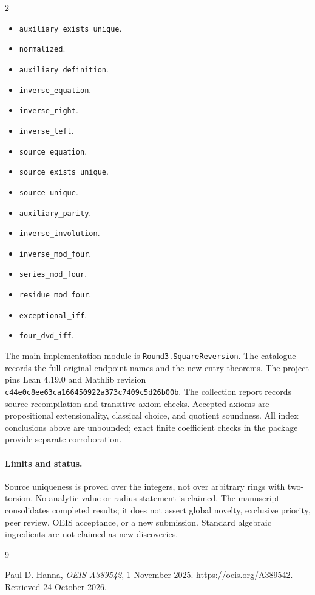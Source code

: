 \documentclass[11pt,a4paper]{article}
\theoremstyle{remark}
\begin{document}
\begin{multicols}{2}\raggedright\begin{itemize}\setlength{\itemsep}{2pt}\setlength{\parsep}{0pt}
\item \nolinkurl{auxiliary_exists_unique}.
\item \nolinkurl{normalized}.
\item \nolinkurl{auxiliary_definition}.
\item \nolinkurl{inverse_equation}.
\item \nolinkurl{inverse_right}.
\item \nolinkurl{inverse_left}.
\item \nolinkurl{source_equation}.
\item \nolinkurl{source_exists_unique}.
\item \nolinkurl{source_unique}.
\item \nolinkurl{auxiliary_parity}.
\item \nolinkurl{inverse_involution}.
\item \nolinkurl{inverse_mod_four}.
\item \nolinkurl{series_mod_four}.
\item \nolinkurl{residue_mod_four}.
\item \nolinkurl{exceptional_iff}.
\item \nolinkurl{four_dvd_iff}.
\end{itemize}\end{multicols}

The main implementation module is \nolinkurl{Round3.SquareReversion}.
The catalogue records the full original endpoint names and the new entry
theorems. The project pins Lean 4.19.0 and Mathlib revision
\nolinkurl{c44e0c8ee63ca166450922a373c7409c5d26b00b}. The collection
report records source recompilation and transitive axiom checks. Accepted
axioms are propositional extensionality, classical choice, and quotient
soundness. All index conclusions above are unbounded; exact finite
coefficient checks in the package provide separate corroboration.

\paragraph{Limits and status.}
Source uniqueness is proved over the integers, not over arbitrary rings with two-torsion. No analytic value or radius statement is claimed.
The manuscript consolidates completed results; it does not assert global
novelty, exclusive priority, peer review, OEIS acceptance, or a new submission.
Standard algebraic ingredients are not claimed as new discoveries.

\begin{thebibliography}{9}
\raggedright
{}
Paul D. Hanna, \emph{OEIS A389542}, 1 November 2025.
\url{https://oeis.org/A389542}. Retrieved 24 October 2026.
\end{thebibliography}
\end{document}
